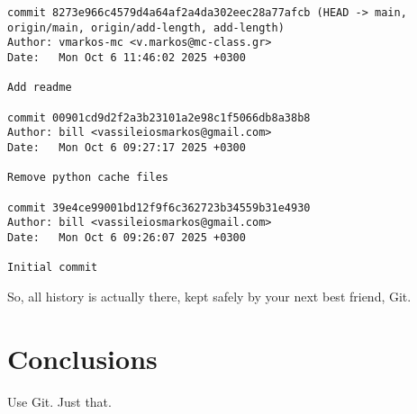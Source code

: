 \documentclass[a4paper, 11pt]{article}
\numberwithin{equation}{section}
\theoremstyle{definition}
\begin{document}
	\begin{lstlisting}
commit 8273e966c4579d4a64af2a4da302eec28a77afcb (HEAD -> main, origin/main, origin/add-length, add-length)
Author: vmarkos-mc <v.markos@mc-class.gr>
Date:   Mon Oct 6 11:46:02 2025 +0300

Add readme

commit 00901cd9d2f2a3b23101a2e98c1f5066db8a38b8
Author: bill <vassileiosmarkos@gmail.com>
Date:   Mon Oct 6 09:27:17 2025 +0300

Remove python cache files

commit 39e4ce99001bd12f9f6c362723b34559b31e4930
Author: bill <vassileiosmarkos@gmail.com>
Date:   Mon Oct 6 09:26:07 2025 +0300

Initial commit\end{lstlisting}
	So, all history is actually there, kept safely by your next best friend, Git.
	\section{Conclusions}\label{sec:Conclusions}
	Use Git. Just that.
	\nocite{*}
	\printbibliography
\end{document}
